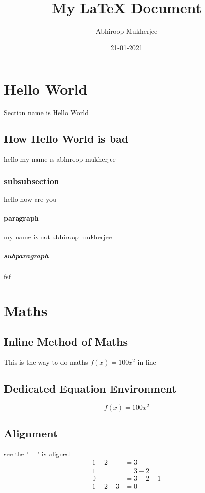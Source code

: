 \documentclass{article}
\author{Abhiroop Mukherjee}
\date{21-01-2021}
\title{My LaTeX Document}
\begin{document}
\maketitle
\newpage
{}

\section{Hello World}
Section name is Hello World

\subsection{How Hello World is bad}
hello my name is abhiroop mukherjee

\subsubsection{subsubsection}
hello how are you

\paragraph{paragraph}
my name is not abhiroop mukherjee

\subparagraph{subparagraph}
fsf

\newpage
\section{Maths}

\subsection{Inline Method of Maths}
This is the way to do maths $f(x)=100x^2$ in line

\subsection{Dedicated Equation Environment}
\begin{equation*}
    f(x) = 100 x^2
\end{equation*}

\subsection{Alignment}
see the '$=$' is aligned
\begin{align*}
    1 + 2     & = 3     \\
    1         & = 3 - 2 \\
    0         & = 3-2-1 \\
    1 + 2 - 3 & =  0
\end{align*}
\end{document}
